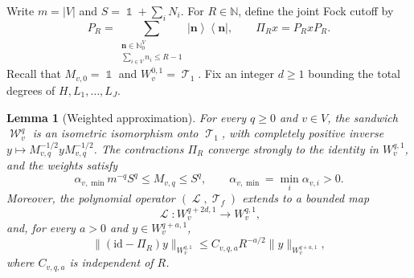 \documentclass[11pt]{article}
\theoremstyle{myplain}
\newtheorem{lem}[lem]{Lemma}
\theoremstyle{mydefinition}
\theoremstyle{remark}
\DeclareMathOperator{\cL}{\mathcal{L}}
\DeclareMathOperator{\cT}{\mathcal{T}}
\DeclareMathOperator{\cW}{\mathcal{W}}
\DeclareMathOperator{\1}{\mathds{1}}
\newcommand{\ketbra}[2]{\left\vert#1\right\rangle\!\! \left\langle#2\right\vert}
\begin{document}
    Write $m = |V|$ and $S = \1 + \sum_i N_i$. For $R \in \mathbb N$, define the joint Fock cutoff by
    \begin{equation*}
        P_R  = \sum_{\substack{\boldsymbol n \in \mathbb N_0^V \\ \sum_{i \in V} n_i \leq R-1}} \ketbra{\boldsymbol n}{\boldsymbol n},
        \qquad \Pi_R x = P_R x P_R.
    \end{equation*}
    Recall that $M_{v,0} = \1$ and $W_v^{0,1} = \cT_1$. Fix an integer $d \geq 1$ bounding the total degrees of $H,L_1,\ldots,L_J$.

    \begin{lem}[Weighted approximation]\label{appx-lem:concentrated-weight-calculus}
        For every $q \geq 0$ and $v \in V$, the sandwich $\cW_v^q$ is an isometric isomorphism onto $\cT_1$, with completely positive inverse $y \mapsto M_{v,q}^{-1/2} y M_{v,q}^{-1/2}$. The contractions $\Pi_R$ converge strongly to the identity in $W_v^{q,1}$, and the weights satisfy
        \begin{equation}\label{appx-eq:concentrated-total-comparison}
            \alpha_{v,\min} m^{-q} S^q \leq M_{v,q} \leq S^q,
            \qquad \alpha_{v,\min} = \min_i \alpha_{v,i} > 0.
        \end{equation}
        Moreover, the polynomial operator $(\cL,\cT_f)$ extends to a bounded map
        \begin{equation}\label{appx-eq:polynomial-weighted-map}
            \cL : W_v^{q+2d,1} \longrightarrow W_v^{q,1},
        \end{equation}
        and, for every $a > 0$ and $y \in W_v^{q+a,1}$,
        \begin{equation}\label{appx-eq:weighted-cutoff-tail}
            \|(\mathrm{id} - \Pi_R)y\|_{W_v^{q,1}} \leq C_{v,q,a} R^{-a/2} \|y\|_{W_v^{q+a,1}},
        \end{equation}
        where $C_{v,q,a}$ is independent of $R$.
    \end{lem}
\end{document}

